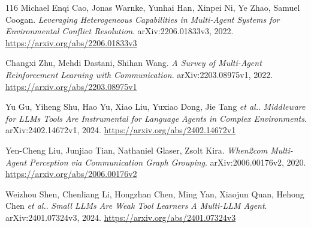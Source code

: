 \documentclass[11pt,a4paper]{article}
\begin{document}
\begin{thebibliography}{116}
Michael Enqi Cao, Jonas Warnke, Yunhai Han, Xinpei Ni, Ye Zhao, Samuel Coogan.
\newblock \emph{Leveraging Heterogeneous Capabilities in Multi-Agent Systems for Environmental Conflict Resolution}.
\newblock arXiv:2206.01833v3, 2022.
\newblock \url{https://arxiv.org/abs/2206.01833v3}

Changxi Zhu, Mehdi Dastani, Shihan Wang.
\newblock \emph{A Survey of Multi-Agent Reinforcement Learning with Communication}.
\newblock arXiv:2203.08975v1, 2022.
\newblock \url{https://arxiv.org/abs/2203.08975v1}

Yu Gu, Yiheng Shu, Hao Yu, Xiao Liu, Yuxiao Dong, Jie Tang \emph{et al.}.
\newblock \emph{Middleware for LLMs Tools Are Instrumental for Language Agents in Complex Environments}.
\newblock arXiv:2402.14672v1, 2024.
\newblock \url{https://arxiv.org/abs/2402.14672v1}

Yen-Cheng Liu, Junjiao Tian, Nathaniel Glaser, Zsolt Kira.
\newblock \emph{When2com Multi-Agent Perception via Communication Graph Grouping}.
\newblock arXiv:2006.00176v2, 2020.
\newblock \url{https://arxiv.org/abs/2006.00176v2}

Weizhou Shen, Chenliang Li, Hongzhan Chen, Ming Yan, Xiaojun Quan, Hehong Chen \emph{et al.}.
\newblock \emph{Small LLMs Are Weak Tool Learners A Multi-LLM Agent}.
\newblock arXiv:2401.07324v3, 2024.
\newblock \url{https://arxiv.org/abs/2401.07324v3}

\end{thebibliography}
\end{document}
